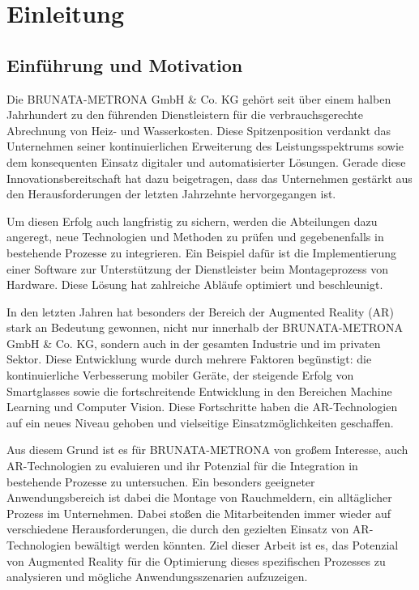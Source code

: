 \chapter{Einleitung}

\section{Einführung und Motivation}

Die BRUNATA-METRONA GmbH \& Co. KG gehört seit über einem halben Jahrhundert zu den führenden Dienstleistern für die verbrauchsgerechte Abrechnung von Heiz- und Wasserkosten. Diese Spitzenposition verdankt das Unternehmen seiner kontinuierlichen Erweiterung des Leistungsspektrums sowie dem konsequenten Einsatz digitaler und automatisierter Lösungen. Gerade diese Innovationsbereitschaft hat dazu beigetragen, dass das Unternehmen gestärkt aus den Herausforderungen der letzten Jahrzehnte hervorgegangen ist.

Um diesen Erfolg auch langfristig zu sichern, werden die Abteilungen dazu angeregt, neue Technologien und Methoden zu prüfen und gegebenenfalls in bestehende Prozesse zu integrieren. Ein Beispiel dafür ist die Implementierung einer Software zur Unterstützung der Dienstleister beim Montageprozess von Hardware. Diese Lösung hat zahlreiche Abläufe optimiert und beschleunigt.

In den letzten Jahren hat besonders der Bereich der Augmented Reality (AR) stark an Bedeutung gewonnen, nicht nur innerhalb der BRUNATA-METRONA GmbH \& Co. KG, sondern auch in der gesamten Industrie und im privaten Sektor. Diese Entwicklung wurde durch mehrere Faktoren begünstigt: die kontinuierliche Verbesserung mobiler Geräte, der steigende Erfolg von Smartglasses sowie die fortschreitende Entwicklung in den Bereichen Machine Learning und Computer Vision. Diese Fortschritte haben die AR-Technologien auf ein neues Niveau gehoben und vielseitige Einsatzmöglichkeiten geschaffen.

Aus diesem Grund ist es für BRUNATA-METRONA von großem Interesse, auch AR-Technologien zu evaluieren und ihr Potenzial für die Integration in bestehende Prozesse zu untersuchen. Ein besonders geeigneter Anwendungsbereich ist dabei die Montage von Rauchmeldern, ein alltäglicher Prozess im Unternehmen. Dabei stoßen die Mitarbeitenden immer wieder auf verschiedene Herausforderungen, die durch den gezielten Einsatz von AR-Technologien bewältigt werden könnten. Ziel dieser Arbeit ist es, das Potenzial von Augmented Reality für die Optimierung dieses spezifischen Prozesses zu analysieren und mögliche Anwendungsszenarien aufzuzeigen.

